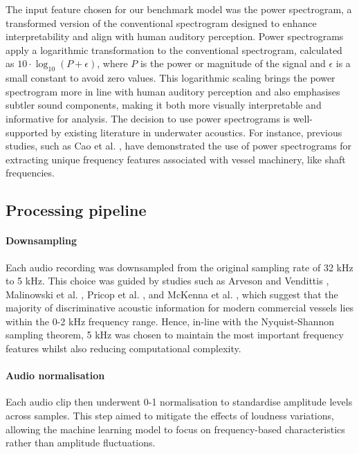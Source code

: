 The input feature chosen for our benchmark model was the power spectrogram, a transformed version of the conventional spectrogram designed to enhance interpretability and align with human auditory perception. Power spectrograms apply a logarithmic transformation to the conventional spectrogram, calculated as $10 \cdot \log_{10}(P + \epsilon)$, where $P$ is the power or magnitude of the signal and $\epsilon$ is a small constant to avoid zero values. This logarithmic scaling brings the power spectrogram more in line with human auditory perception and also emphasises subtler sound components, making it both more visually interpretable and informative for analysis. The decision to use power spectrograms is well-supported by existing literature in underwater acoustics. For instance, previous studies, such as Cao et al. \cite{cao_underwater_2019}, have demonstrated the use of power spectrograms for extracting unique frequency features associated with vessel machinery, like shaft frequencies. 

\subsection{Processing pipeline}

\paragraph{Downsampling}
Each audio recording was downsampled from the original sampling rate of 32 kHz to 5 kHz. This choice was guided by studies such as Arveson and Vendittis \cite{arveson_radiated_2000}, Malinowski et al. \cite{malinowski_underwater_2001}, Pricop et al. \cite{pricop_underwater_2010}, and McKenna et al. \cite{mckenna_underwater_2012}, which suggest that the majority of discriminative acoustic information for modern commercial vessels lies within the 0-2 kHz frequency range. Hence, in-line with the Nyquist-Shannon sampling theorem, 5 kHz was chosen to maintain the most important frequency features whilst also reducing computational complexity. 

\paragraph{Audio normalisation}
Each audio clip then underwent 0-1 normalisation to standardise amplitude levels across samples. This step aimed to mitigate the effects of loudness variations, allowing the machine learning model to focus on frequency-based characteristics rather than amplitude fluctuations.

